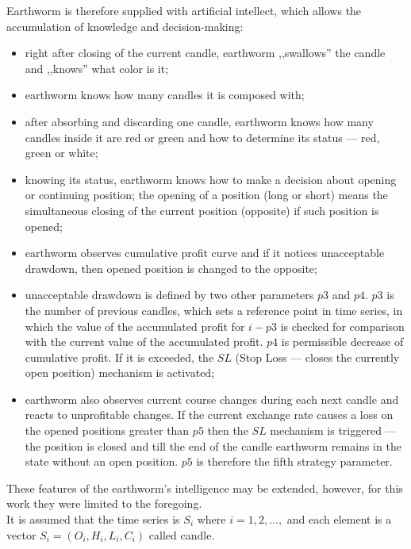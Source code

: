 \documentclass[runningheads,a4paper]{llncs}
\begin{document}
Earthworm is therefore supplied with artificial intellect, which allows the accumulation of knowledge and decision-making:
\begin{itemize}
\item right after closing of the current candle, earthworm ,,swallows'' the candle and ,,knows'' what color is it;
\item earthworm knows how many candles it is composed with;
\item after absorbing and discarding one candle, earthworm knows how many candles inside it are red or green and how to determine its status --- red, green or white;
\item knowing its status, earthworm knows how to make a decision about opening or continuing position; the opening of a position (long or short) means the simultaneous closing of the current position (opposite) if such position is opened;
\item earthworm observes cumulative profit curve and if it  notices unacceptable drawdown, then opened position is changed to the opposite;
\item unacceptable drawdown is defined by two other parameters $p3$ and $p4$. $p3$ is the number of previous candles, which sets a reference point in time series, in which the value of the accumulated profit for $i-p3$ is checked for comparison with the current value of the accumulated profit. $p4$ is permissible decrease of cumulative profit. If it is exceeded, the $SL$ (Stop Loss --- closes the currently open position) mechanism is activated;
\item earthworm also observes current course changes during  each next candle and reacts to unprofitable changes. If the current exchange rate causes a loss on the opened positions greater than $p5$ then the $SL$ mechanism is triggered --- the position is closed and till the end of the candle earthworm remains in the state without an open position. $p5$ is therefore the fifth strategy parameter. 
\end{itemize}

These features of the earthworm's intelligence may be extended, however, for this work they were limited to the foregoing. \\

It is assumed that the time series is $S_i$ where $i = 1, 2, ...,$ and each element is a vector $S_i = (O_i, H_i, L_i, C_i)$ called candle.\\
\end{document}
